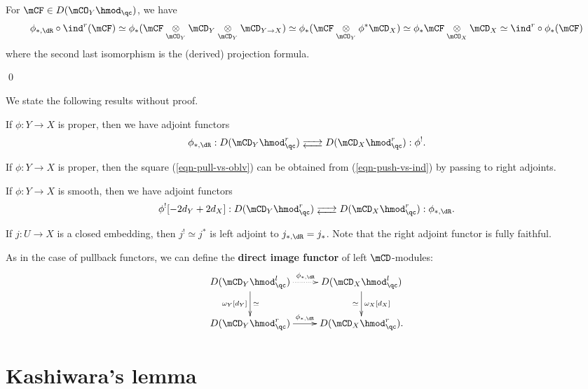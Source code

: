 	\proof[Sketch]
		For $\mCF\in D(\mCO_Y\hmod_\qc)$, we have
		\[
			\phi_{*,\dR}\circ \ind^r(\mCF) \simeq \phi_*(\mCF \ot_{\mCO_Y} \mCD_Y \ot_{\mCD_Y} \mCD_{Y\to X} ) \simeq \phi_*(\mCF \ot_{\mCO_Y} \phi^*\mCD_X ) \simeq \phi_*\mCF \ot_{\mCO_X} \mCD_X \simeq \ind^r\circ \phi_*(\mCF)
		\]
		where the second last isomorphism is the (derived) projection formula.

	\qed

	We state the following results without proof.

	\begin{prop}
		If $\phi:Y \to X$ is proper, then we have adjoint functors
		\[
			\phi_{*,\dR}: D( \mCD_Y\hmod_\qc^r ) \adj  D( \mCD_X\hmod_\qc^r ): \phi^!.
		\]
	\end{prop}

	\begin{rem}
		If $\phi:Y \to X$ is proper, then the square (\ref{eqn-pull-vs-oblv}) can be obtained from (\ref{eqn-push-vs-ind}) by passing to right adjoints.
	\end{rem}

	\begin{prop}
		If $\phi:Y \to X$ is smooth, then we have adjoint functors
		\[
			\phi^![-2 d_Y+2d_X]: D( \mCD_Y\hmod_\qc^r ) \adj  D( \mCD_X\hmod_\qc^r ): \phi_{*,\dR}.
		\]
	\end{prop}

	\begin{exam}
		\label{exam-push-open-embedding}
		If $j: U\to X$ is a closed embedding, then $j^!\simeq j^*$ is left adjoint to $j_{*,\dR}=j_*$. Note that the right adjoint functor is fully faithful.
	\end{exam}

	

	

	\begin{constr}
		As in the case of pullback functors, we can define the \textbf{direct image functor} of left $\mCD$-modules:
		\[
			\xymatrix{
				D(\mCD_Y\hmod^l_\qc) \ar@{.>}[r]^-{\phi_{*,\dR}} \ar[d]_-{\omega_Y[d_Y]}^-\simeq &
				D(\mCD_X\hmod^l_\qc) \ar[d]^-{\omega_X[d_X]}_-\simeq \\
				D(\mCD_Y\hmod^r_\qc) \ar[r]^-{\phi_{*,\dR}} &
				D(\mCD_X\hmod^r_\qc).
			}
		\]
	\end{constr}



\section{Kashiwara's lemma}

